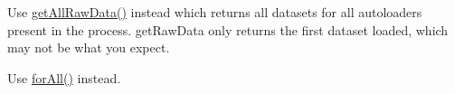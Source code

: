 
\begin{DoxyRefList}
\item[Global \mbox{\hyperlink{class_composer_1_1_installed_versions_a6ecee8643c03c515b55686f03d117665}{Installed\+Versions\+::get\+Raw\+Data}} ()]\label{deprecated__deprecated000001}%
%
Use \mbox{\hyperlink{class_composer_1_1_installed_versions_a3a09ac4f4e098f4c04c31cfb88a8e256}{get\+All\+Raw\+Data()}} instead which returns all datasets for all autoloaders present in the process. get\+Raw\+Data only returns the first dataset loaded, which may not be what you expect.  
\item[Global \mbox{\hyperlink{class_php_option_1_1_option_a9d0bcba5d95c1924c65960f08dd5ddcf}{Option\+::if\+Defined}} (\$callable)]\label{deprecated__deprecated000002}%
%
Use \mbox{\hyperlink{class_php_option_1_1_option_a8145ff8ed91954e38555f72f6d739576}{for\+All()}} instead.
\end{DoxyRefList}